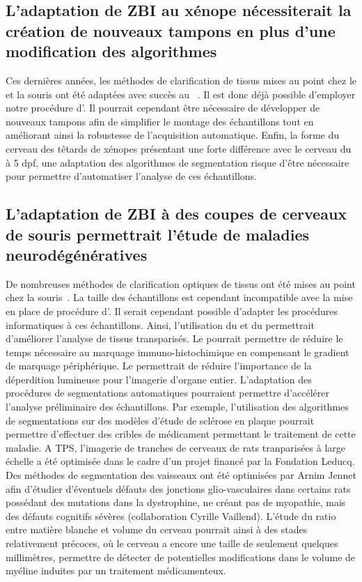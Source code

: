 \documentclass[\main/main.tex]{subfiles}
\begin{document}
    \subsection{L'adaptation de ZBI au xénope nécessiterait la création de nouveaux tampons en plus d'une modification des algorithmes}
%
Ces dernières années, les méthodes de clarification de tissus mises au point chez le \pz{} et la souris ont été adaptées avec succès au \xl{}~\cite{fini_2017,affaticati_2018}.
%
Il est donc déjà possible d'employer notre procédure d'\hti.
%
Il pourrait cependant être nécessaire de développer de nouveaux tampons afin de simplifier le montage des échantillons
tout en améliorant ainsi la robustesse de l'acquisition automatique.
%
Enfin, la forme du cerveau des têtards de xénopes présentant une forte différence avec le cerveau du \pz{} à 5 dpf,
une adaptation des algorithmes de segmentation risque d'être nécessaire pour permettre d'automatiser l'analyse de ces échantillons.

    \subsection{L'adaptation de ZBI à des coupes de cerveaux de souris permettrait l'étude de maladies neurodégénératives}
    
De nombreuses méthodes de clarification optiques de tissus ont été mises au point chez la souris~\cite{tainaka_2016,tomer_2014}.
%
La taille des échantillons est cependant incompatible avec la mise en place de procédure d'\hti{}.
%
Il serait cependant possible d'adapter les procédures informatiques à ces échantillons.
%
Ainsi, l'utilisation du \sbddcc{} et du \sblc{} permettrait d'améliorer l'analyse de tissus transparisés.
%
Le \sblc{} pourrait permettre de réduire le temps nécessaire au marquage immuno-histochimique en compensant le gradient de marquage périphérique.
%
Le \sbddcc{} permettrait de réduire l'importance de la déperdition lumineuse pour l'imagerie d'organe entier.
%
L'adaptation des procédures de segmentations automatiques pourraient permettre d'accélérer l'analyse préliminaire des échantillons.
%
Par exemple, l'utilisation des algorithmes de segmentations sur des modèles d'étude de sclérose en plaque pourrait permettre d'effectuer des cribles de médicament permettant le traitement de cette maladie.
%
A TPS, l'imagerie de tranches de cerveaux de rats tranparisées à large échelle  a été optimisée dans le cadre d'un projet financé par la Fondation Leducq. Des méthodes de segmentation des vaisseaux ont été optimisées par Arnim Jennet afin d'étudier d'éventuels défauts des jonctions glio-vasculaires dans certains rats possédant des mutations dans la dystrophine, ne créant pas de myopathie, mais des défauts cognitifs sévères (collaboration Cyrille Vaillend).  
%
L'étude du ratio entre matière blanche et volume du cerveau pourrait ainsi à des stades relativement précoces, où le cerveau a encore une taille de seulement quelques millimètres, permettre de détecter de potentielles modifications dans le volume de myéline induites par un traitement médicamenteux.
\end{document}
